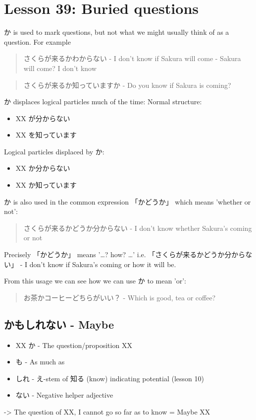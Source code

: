 \documentclass[11pt]{article}
\begin{document}
\section{Lesson 39: Buried questions}
\label{sec:orgcd35b77}
か is used to mark questions, but not what we might usually think of as a question. For example
\begin{quote}
さくらが来るかわからない - I don't know if Sakura will come - Sakura will come? I don't know
\end{quote}
\begin{quote}
さくらが来るか知っていますか - Do you know if Sakura is coming?
\end{quote}

か displaces logical particles much of the time:
Normal structure:
\begin{itemize}
\item XX が分からない
\item XX を知っています
\end{itemize}
Logical particles displaced by か:
\begin{itemize}
\item XX か分からない
\item XX か知っています
\end{itemize}

か is also used in the common expression 「かどうか」 which means 'whether or not':
\begin{quote}
さくらが来るかどうか分からない - I don't know whether Sakura's coming or not
\end{quote}
Precisely 「かどうか」 means '\ldots{}? how? \ldots{}' i.e. 「さくらが来るかどうか分からない」 - I don't know if Sakura's coming or how it will be.

From this usage we can see how we can use か to mean 'or':
\begin{quote}
お茶かコーヒーどちらがいい？ - Which is good, tea or coffee?
\end{quote}

\subsection{かもしれない - Maybe}
\label{sec:org4a836b5}
\begin{itemize}
\item XX か - The question/proposition XX
\item も - As much as
\item しれ - え-stem of 知る (know) indicating potential (lesson 10)
\item ない - Negative helper adjective
\end{itemize}
-> The question of XX, I cannot go so far as to know = Maybe XX
\end{document}
